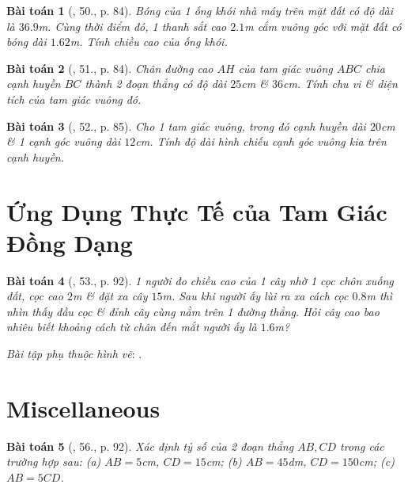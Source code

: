 \documentclass{article}
\newtheorem{baitoan}{Bài toán}
\begin{document}
\begin{baitoan}[\cite{SGK_Toan_8_tap_2}, 50., p. 84]
	Bóng của 1 ống khói nhà máy trên mặt đất có độ dài là $36.9$\emph{m}. Cùng thời điểm đó, 1 thanh sắt cao $2.1$\emph{m} cắm vuông góc với mặt đất có bóng dài $1.62$\emph{m}. Tính chiều cao của ống khói.
\end{baitoan}

\begin{baitoan}[\cite{SGK_Toan_8_tap_2}, 51., p. 84]
	Chân đường cao $AH$ của tam giác vuông $ABC$ chia cạnh huyền $BC$ thành 2 đoạn thẳng có độ dài $25$\emph{cm} \& $36$\emph{cm}. Tính chu vi \& diện tích của tam giác vuông đó.
\end{baitoan}

\begin{baitoan}[\cite{SGK_Toan_8_tap_2}, 52., p. 85]
	Cho 1 tam giác vuông, trong đó cạnh huyền dài $20$\emph{cm} \& 1 cạnh góc vuông dài $12$\emph{cm}. Tính độ dài hình chiếu cạnh góc vuông kia trên cạnh huyền.
\end{baitoan}


\section{Ứng Dụng Thực Tế của Tam Giác Đồng Dạng}

\begin{baitoan}[\cite{SGK_Toan_8_tap_2}, 53., p. 92]
	1  người đo chiều cao của 1 cây nhờ 1 cọc chôn xuống đất, cọc cao $2$\emph{m} \& đặt xa cây $15$\emph{m}. Sau khi người ấy lùi ra xa cách cọc $0.8$\emph{m} thì nhìn thấy đầu cọc \& đỉnh cây cùng nằm trên 1 đường thẳng. Hỏi cây cao bao nhiêu biết khoảng cách từ chân đến mắt người ấy là $1.6$\emph{m}?
\end{baitoan}
\noindent\textit{Bài tập phụ thuộc hình vẽ}: \cite[54.--55., p. 87]{SGK_Toan_8_tap_2}.


\section{Miscellaneous}

\begin{baitoan}[\cite{SGK_Toan_8_tap_2}, 56., p. 92]
	Xác định tỷ số của 2 đoạn thẳng $AB,CD$ trong các trường hợp sau: (a) $AB = 5$\emph{cm}, $CD = 15$\emph{cm}; (b) $AB = 45$\emph{dm}, $CD = 150$\emph{cm}; (c) $AB = 5CD$.
\end{baitoan}
\end{document}
